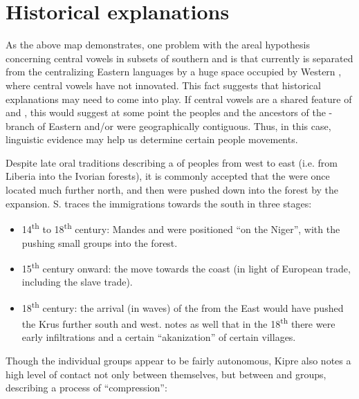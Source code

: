 \documentclass[output=paper,newtxmath,modfonts,nonflat,draft]{langsci/langscibook}
\begin{document}
\section{Historical explanations}\label{sec:zogbo:6} 

As the above map demonstrates, one problem with the areal hypothesis concerning central vowels in subsets of southern  and  is that currently  is separated from the centralizing Eastern languages by a huge space occupied by Western , where central vowels have not innovated. This fact suggests that historical explanations may need to come into play. If central vowels are a shared feature of  and , this would suggest at some point the  peoples and the ancestors of the - branch of Eastern  and/or  were geographically contiguous. Thus, in this case, linguistic evidence may help us determine certain people movements.   

Despite late oral traditions describing a  of  peoples from west to east (i.e. from Liberia into the Ivorian forests), it is commonly accepted that the  were once located much further north, and then were pushed down into the forest by the  expansion. S. \citet{Lafage1983} traces the  immigrations towards the south in three stages:

\begin{itemize}
\item 14\textsuperscript{th} to 18\textsuperscript{th} century: Mandes and  were positioned “on the Niger”, with the  pushing small  groups into the forest.\\[-0.75cm] 
\item 15\textsuperscript{th} century onward: the  move towards the coast (in light of European trade, including the slave trade). \\[-0.75cm]
\item 18\textsuperscript{th} century: the arrival (in waves) of the  from the East would have pushed the Krus further south and west. \citet[68]{kipre2005} notes as well that in the 18\textsuperscript{th} there were early  infiltrations and a certain “akanization” of certain  villages.
\end{itemize}

Though the individual  groups appear to be fairly autonomous, Kipre also notes a high level of contact not only between  themselves, but between  and  groups, describing a process of ``compression'': 
\end{document}
